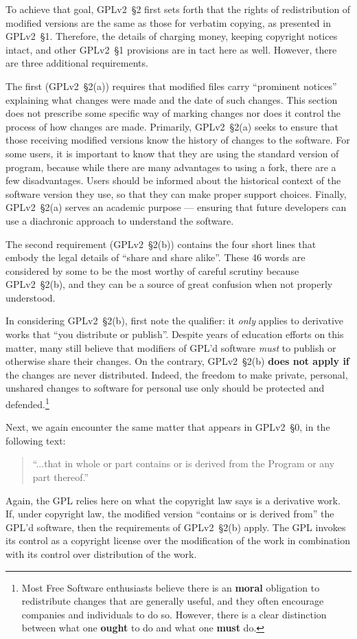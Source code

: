 To achieve that goal, GPLv2~\S2 first sets forth that the rights of
redistribution of modified versions are the same as those for verbatim
copying, as presented in GPLv2~\S1.  Therefore, the details of charging money,
keeping copyright notices intact, and other GPLv2~\S1 provisions are in tact
here as well.  However, there are three additional requirements.

The first (GPLv2~\S2(a)) requires that modified files carry ``prominent
notices'' explaining what changes were made and the date of such
changes. This section does not prescribe some specific way of
marking changes nor does it control the process of how changes are made.
Primarily, GPLv2~\S2(a) seeks to ensure that those receiving modified
versions know the history of changes to the software.  For some users,
it is important to know that they are using the standard version of
program, because while there are many advantages to using a fork,
there are a few disadvantages.  Users should be informed about the
historical context of the software version they use, so that they can
make proper support choices.  Finally, GPLv2~\S2(a) serves an academic
purpose --- ensuring that future developers can use a diachronic
approach to understand the software.

\medskip

The second requirement (GPLv2~\S2(b)) contains the four short lines that embody
the legal details of ``share and share alike''.  These 46 words are
considered by some to be the most worthy of careful scrutiny because
GPLv2~\S2(b), and they
can be a source of great confusion when not properly understood.

In considering GPLv2~\S2(b), first note the qualifier: it \textit{only} applies to
derivative works that ``you distribute or publish''.  Despite years of
education efforts on this matter, many still believe that modifiers
of GPL'd software \textit{must} to publish or otherwise
share their changes.  On the contrary, GPLv2~\S2(b) {\bf does not apply if} the
changes are never distributed.  Indeed, the freedom to make private,
personal, unshared changes to software for personal use only should be
protected and defended.\footnote{Most Free Software enthusiasts believe there is an {\bf
    moral} obligation to redistribute changes that are generally useful,
  and they often encourage companies and individuals to do so.  However, there
  is a clear distinction between what one {\bf ought} to do and what one
  {\bf must} do.}

Next, we again encounter the same matter that appears in GPLv2~\S0, in the
following text:
\begin{quote}
``...that in whole or part contains or is derived from the Program or any part thereof.''
\end{quote}
Again, the GPL relies here on what the copyright law says is a derivative
work.  If, under copyright law, the modified version ``contains or is
derived from'' the GPL'd software, then the requirements of GPLv2~\S2(b)
apply.  The GPL invokes its control as a copyright license over the
modification of the work in combination with its control over distribution
of the work.


